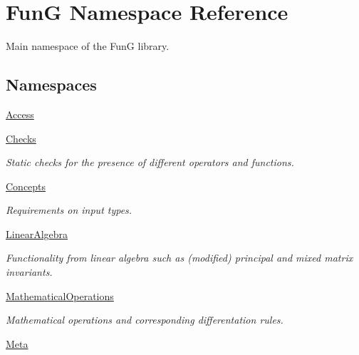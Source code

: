 \hypertarget{namespaceFunG}{}\section{FunG Namespace Reference}
\label{namespaceFunG}


Main namespace of the FunG library.  


\subsection*{Namespaces}
\begin{DoxyCompactItemize}
\item 
 \hyperlink{namespaceFunG_1_1Access}{Access}
\item 
 \hyperlink{namespaceFunG_1_1Checks}{Checks}
\begin{DoxyCompactList}\small\item\em Static checks for the presence of different operators and functions. \end{DoxyCompactList}\item 
 \hyperlink{namespaceFunG_1_1Concepts}{Concepts}
\begin{DoxyCompactList}\small\item\em Requirements on input types. \end{DoxyCompactList}\item 
 \hyperlink{namespaceFunG_1_1LinearAlgebra}{Linear\+Algebra}
\begin{DoxyCompactList}\small\item\em Functionality from linear algebra such as (modified) principal and mixed matrix invariants. \end{DoxyCompactList}\item 
 \hyperlink{namespaceFunG_1_1MathematicalOperations}{Mathematical\+Operations}
\begin{DoxyCompactList}\small\item\em Mathematical operations and corresponding differentation rules. \end{DoxyCompactList}\item 
 \hyperlink{namespaceFunG_1_1Meta}{Meta}
\end{DoxyCompactItemize}

